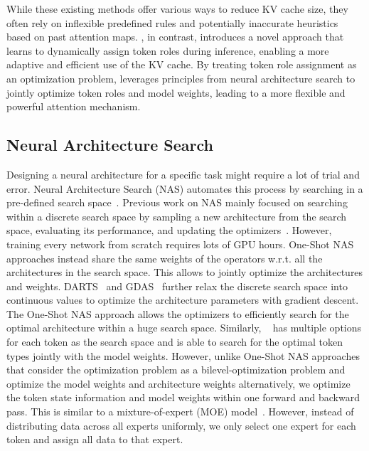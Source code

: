 While these existing methods offer various ways to reduce KV cache size, they often rely on inflexible predefined rules and potentially inaccurate heuristics based on past attention maps. \ourname, in contrast, introduces a novel approach that learns to dynamically assign token roles during inference, enabling a more adaptive and efficient use of the KV cache. By treating token role assignment as an optimization problem, \ourname{} leverages principles from neural architecture search to jointly optimize token roles and model weights, leading to a more flexible and powerful attention mechanism.

\subsection{Neural Architecture Search}
Designing a neural architecture for a specific task might require a lot of trial and error. Neural Architecture Search (NAS) automates this process by searching in a pre-defined search space~\cite{elsken-jmlr19a}. Previous work on NAS mainly focused on searching within a discrete search space by sampling a new architecture from the search space, evaluating its performance, and updating the optimizers~\cite{zoph-iclr17a, zoph-cvpr18a}. However, training every network from scratch requires lots of GPU hours. One-Shot NAS~\cite{pham-icml18a} approaches instead share the same weights of the operators w.r.t. all the architectures in the search space. This allows to jointly optimize the architectures and weights. DARTS~\cite{liu-iclr19a} and GDAS~\cite{dong-cvpr19a} further relax the discrete search space into continuous values to optimize the architecture parameters with gradient descent. The One-Shot NAS approach allows the optimizers to efficiently search for the optimal architecture within a huge search space. Similarly, \ourname~ has multiple options for each token as the search space and is able to search for the optimal token types jointly with the model weights. However, unlike One-Shot NAS approaches that consider the optimization problem as a bilevel-optimization problem and optimize the model weights and architecture weights alternatively, we optimize the token state information and model weights within one forward and backward pass. This is similar to a mixture-of-expert (MOE) model~\cite{shazzer-iclr17a, fedus-jmlr23a}. However, instead of distributing data across all experts uniformly, we only select one expert for each token and assign all data to that expert.